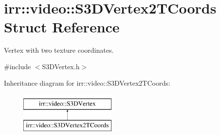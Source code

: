 \hypertarget{structirr_1_1video_1_1S3DVertex2TCoords}{}\section{irr\+:\+:video\+:\+:S3\+D\+Vertex2\+T\+Coords Struct Reference}
\label{structirr_1_1video_1_1S3DVertex2TCoords}


Vertex with two texture coordinates.  




{\ttfamily \#include $<$S3\+D\+Vertex.\+h$>$}

Inheritance diagram for irr\+:\+:video\+:\+:S3\+D\+Vertex2\+T\+Coords\+:\begin{figure}[H]
\begin{center}
\leavevmode
\includegraphics[height=2.000000cm]{structirr_1_1video_1_1S3DVertex2TCoords}
\end{center}
\end{figure}
